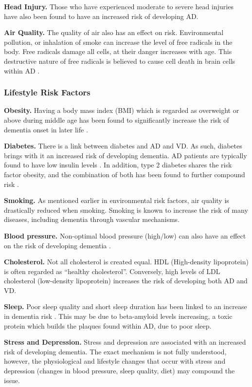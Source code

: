 \textbf{Head Injury.}
Those who have experienced moderate to severe head injuries have also been found to have an increased risk of developing AD.

\textbf{Air Quality.}
The quality of air also has an effect on risk. Environmental pollution, or inhalation of smoke can increase the level of free radicals in the body. Free radicals damage all cells, at their danger increases with age. This destructive nature of free radicals is believed to cause cell death in brain cells within AD \cite{AlzheimerEurope2015}.

\subsubsection{Lifestyle Risk Factors}

\textbf{Obesity.}
Having a body mass index (BMI) which is regarded as overweight or above during middle age has been found to significantly increase the risk of dementia onset in later life \cite{Profenno2010}.

\textbf{Diabetes.}
There is a link between diabetes and AD and VD. As such, diabetes brings with it an increased risk of developing dementia. AD patients are typically found to have low insulin levels \cite{Dosunmu2007}. In addition, type 2 diabetes shares the risk factor obesity, and the combination of both has been found to further compound risk \cite{Profenno2010}.

\textbf{Smoking.} As mentioned earlier in environmental risk factors, air quality is drastically reduced when smoking. Smoking is known to increase the risk of many diseases, including dementia through vascular mechanisms.

\textbf{Blood pressure.}
Non-optimal blood pressure (high/low) can also have an effect on the risk of developing dementia \cite{Qiu2005}.

\textbf{Cholesterol.}
Not all cholesterol is created equal. HDL (High-density lipoprotein) is often regarded as ``healthy cholesterol''. Conversely, high levels of LDL cholesterol (low-density lipoprotein) increases the risk of developing both AD and VD.

\textbf{Sleep.}
Poor sleep quality and short sleep duration has been linked to an increase in dementia risk \cite{Tsapanou2015}. This may be due to beta-amyloid levels increasing, a toxic protein which builds the plaques found within AD, due to poor sleep.

\textbf{Stress and Depression.}
Stress and depression are associated with an increased risk of developing dementia\cite{Saczynski2010}. The exact mechanism is not fully understood, however, the physiological and lifestyle changes that occur with stress and depression (changes in blood pressure, sleep quality, diet) may compound the issue\cite{Schneiderman2005, Tsapanou2015}.


